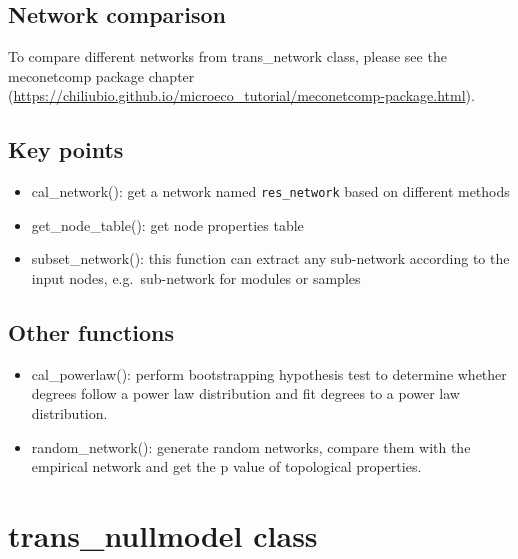 \documentclass[
]{book}
\providecommand{\tightlist}{%
  \setlength{\itemsep}{0pt}\setlength{\parskip}{0pt}}
\begin{document}
\hypertarget{network-comparison}{%
\subsection{Network comparison}\label{network-comparison}}

To compare different networks from trans\_network class,
please see the meconetcomp package chapter (\url{https://chiliubio.github.io/microeco_tutorial/meconetcomp-package.html}).

\hypertarget{key-points-6}{%
\subsection{Key points}\label{key-points-6}}

\begin{itemize}
\tightlist
\item
  cal\_network(): get a network named \texttt{res\_network} based on different methods
\item
  get\_node\_table(): get node properties table
\item
  subset\_network(): this function can extract any sub-network according to the input nodes, e.g.~sub-network for modules or samples
\end{itemize}

\hypertarget{other-functions}{%
\subsection{Other functions}\label{other-functions}}

\begin{itemize}
\tightlist
\item
  cal\_powerlaw(): perform bootstrapping hypothesis test to determine whether degrees follow a power law distribution and fit degrees to a power law distribution.\\
\item
  random\_network(): generate random networks, compare them with the empirical network and get the p value of topological properties.
\end{itemize}

\hypertarget{trans_nullmodel-class}{%
\section{trans\_nullmodel class}\label{trans_nullmodel-class}}
\end{document}

